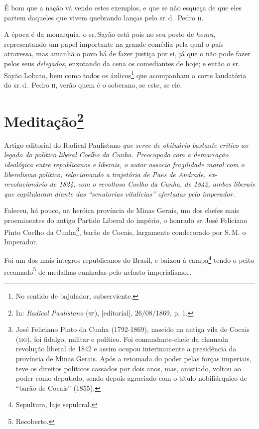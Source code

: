 É bom que a nação vá vendo estes exemplos, e que se não esqueça de que
eles partem daqueles que vivem quebrando lanças pelo sr.\,d.~Pedro \textsc{ii}.

A época é da monarquia, o sr.\,Sayão está pois no seu posto de
\emph{honra}, representando um papel importante na grande comédia pela
qual o país atravessa, mas amanhã o povo há de fazer justiça por si, já
que o não pode fazer pelos seus \emph{delegados}, enxotando da cena os
comediantes de hoje; e então o sr.\,Sayão Lobato, bem como todos os
áulicos\footnote{No sentido de bajulador, subserviente.} que
acompanham a corte laudatória do sr.\,d.~Pedro \textsc{ii}, verão quem é o
soberano, se este, se ele.

\chapter{Meditação\footnote{In: \emph{Radical Paulistano} (\textsc{sp}),
  {[}editorial{]}, 26/08/1869, p. 1.}}

\begin{didascalia}
Artigo editorial do Radical Paulistano \emph{que serve de obituário
bastante crítico ao legado do político liberal Coelho da Cunha.
Preocupado com a demarcação ideológica entre republicanos e liberais, o
autor associa fragilidade moral com o liberalismo político, relacionando
a trajetória de Paes de Andrade, ex-revolucionário de 1824, com o
revoltoso Coelho da Cunha, de 1842, ambos liberais que capitularam
diante das ``senatorias vitalícias'' ofertadas pelo imperador.}
\end{didascalia}



Faleceu, há pouco, na heróica província de Minas Gerais, um dos chefes
mais proeminentes do antigo Partido Liberal do império, o honrado sr.\,José Feliciano Pinto Coelho da Cunha\footnote{José Feliciano Pinto da
  Cunha (1792-1869), nascido na antiga vila de Cocais (\textsc{mg}), foi fidalgo,
  militar e político. Foi comandante-chefe da chamada revolução liberal
  de 1842 e assim ocupou interinamente a presidência da província de
  Minas Gerais. Após a retomada do poder pelas forças imperiais, teve os
  direitos políticos cassados por dois anos, mas, anistiado, voltou ao
  poder como deputado, sendo depois agraciado com o título nobiliárquico
  de ``barão de Cocais'' (1855).}, barão de Cocais, largamente condecorado
por S.\,M. o Imperador.

Foi um dos mais íntegros republicanos do Brasil, e baixou à
campa\footnote{Sepultura, laje sepulcral.} tendo o peito
recamado\footnote{Recoberto.} de medalhas cunhadas pelo nefasto
imperialismo\ldots{}

